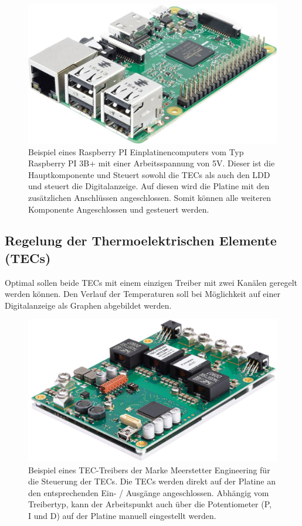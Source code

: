 \begin{figure}[H]
    \centering
    \includegraphics[scale=0.2]{98_images/raspberry_pi_version_3_b.jpg}
    \caption{Beispiel eines Raspberry PI Einplatinencomputers vom Typ Raspberry PI 3B+ mit einer Arbeitsspannung von 5V. Dieser ist die Hauptkomponente und Steuert sowohl die TECs als auch den LDD und steuert die Digitalanzeige. Auf diesen wird die Platine mit den zusätzlichen Anschlüssen angeschlossen. Somit können alle weiteren Komponente Angeschlossen und gesteuert werden.}
    \label{fig:raspberry_pi}
\end{figure}

\subsection{Regelung der Thermoelektrischen Elemente (TECs)}
Optimal sollen beide TECs mit einem einzigen Treiber mit zwei Kanälen geregelt werden können. Den Verlauf der Temperaturen soll bei Möglichkeit auf einer Digitalanzeige als Graphen abgebildet werden.

\begin{figure}[H]
    \centering
    \includegraphics[scale=0.25]{98_images/tec_controller_real_isometry_meerstetter.PNG}
    \caption{Beispiel eines TEC-Treibers der Marke Meerstetter Engineering für die Steuerung der TECs. Die TECs werden direkt auf der Platine an den entsprechenden Ein- / Ausgänge angeschlossen. Abhängig vom Treibertyp, kann der Arbeitspunkt auch über die Potentiometer (P, I und D) auf der Platine manuell eingestellt werden.}
    \label{fig:tec_controller_free}
\end{figure}

